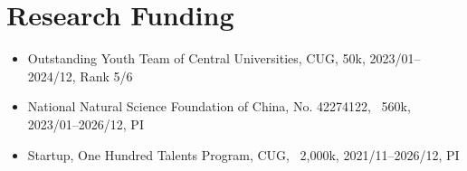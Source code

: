 \section{Research Funding}

\begin{itemize}
\item Outstanding Youth Team of Central Universities, CUG, \textyen 50k, 2023/01--2024/12, Rank 5/6
\item National Natural Science Foundation of China, No. 42274122, \textyen\ 560k, 2023/01--2026/12, PI
\item Startup, One Hundred Talents Program, CUG, \textyen\ 2,000k, 2021/11--2026/12, PI
\end{itemize}
